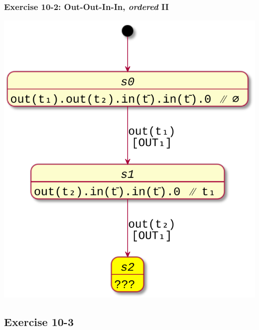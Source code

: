 \documentclass[presentation]{beamer}\mode<presentation>{\usetheme{AMSCesenaPurpleAndGold}}
\begin{document}
\begin{frame}
\frametitle{Exercise 10-2: Out-Out-In-In, \emph{ordered} II}

    \begin{center}
        \includegraphics[width=.5\linewidth]{img/out-out-in-in.pdf}
    \end{center}

\end{frame}

\subsection{Exercise 10-3}
\end{document}
